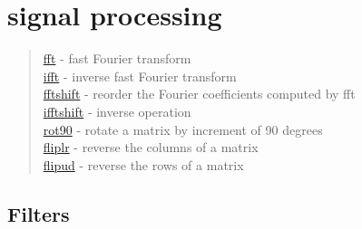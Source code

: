 \chapter*{signal processing}

\begin{quote}
\noindent
\hyperlink{fft}{fft} - {fast Fourier transform} \\
\hyperlink{ifft}{ifft} - {inverse fast Fourier transform} \\
\hyperlink{fftshift}{fftshift} - {reorder the Fourier coefficients computed by fft} \\
\hyperlink{ifftshift}{ifftshift} - {inverse operation} \\
\hyperlink{rot90}{rot90} - {rotate a matrix by increment of 90 degrees} \\
\hyperlink{fliplr}{fliplr} - {reverse the columns of a matrix} \\
\hyperlink{flipud}{flipud} - {reverse the rows of a matrix} \\
\end{quote}

 
 
 

\section{Filters}

